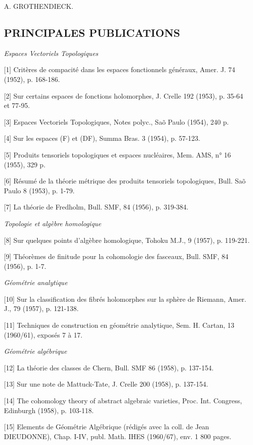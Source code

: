\documentclass[11pt,a4paper]{article}
\begin{document}
A. GROTHENDIECK.

\subsection{PRINCIPALES PUBLICATIONS}

\emph{Espaces Vectoriels Topologiques}

[1] Critères de compacité dans les espaces fonctionnels généraux, Amer. J. 74 (1952), p. 168-186.

[2] Sur certains espaces de fonctions holomorphes, J. Crelle 192 (1953), p. 35-64 et 77-95.

[3] Espaces Vectoriels Topologiques, Notes polyc., Saõ Paulo (1954), 240 p.

[4] Sur les espaces (F) et (DF), Summa Bras. 3 (1954), p. 57-123.

[5] Produits tensoriels topologiques et espaces nucléaires, Mem. AMS, n° 16 (1955), 329 p.

[6] Résumé de la théorie métrique des produits tensoriels topologiques, Bull. Saõ Paulo 8 (1953), p. 1-79.

[7] La théorie de Fredholm, Bull. SMF, 84 (1956), p. 319-384.

\emph{Topologie et algèbre homologique}

[8] Sur quelques points d'algèbre homologique, Tohoku M.J., 9 (1957), p. 119-221.

[9] Théorèmes de finitude pour la cohomologie des fasceaux, Bull. SMF, 84 (1956), p. 1-7.

\emph{Géométrie analytique}

[10] Sur la classification des fibrés holomorphes sur la sphère de Riemann, Amer. J., 79 (1957), p. 121-138.

[11] Techniques de construction en géométrie analytique, Sem. H. Cartan, 13 (1960/61), exposés 7 à 17.

\emph{Géométrie algébrique}

[12] La théorie des classes de Chern, Bull. SMF 86 (1958), p. 137-154.

[13] Sur une note de Mattuck-Tate, J. Crelle 200 (1958), p. 137-154.

[14] The cohomology theory of abstract algebraic varieties, Proc. Int. Congress, Edinburgh (1958), p. 103-118.

[15] Elements de Géométrie Algébrique (rédigés avec la coll. de Jean DIEUDONNE), Chap. I-IV, publ. Math. IHES (1960/67), env. 1 800 pages.
\end{document}
